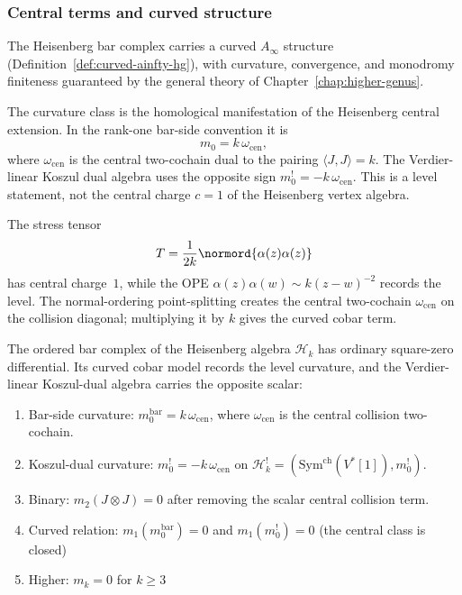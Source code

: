 \subsubsection{Central terms and curved structure}

The Heisenberg bar complex carries a curved $A_\infty$ structure
(Definition~\ref{def:curved-ainfty-hg}), with curvature, convergence,
and monodromy finiteness guaranteed by the general theory of
Chapter~\ref{chap:higher-genus}.

\begin{remark}
The curvature class is the homological manifestation of the
Heisenberg central extension. In the rank-one bar-side convention it
is
\[
m_0=k\,\omega_{\mathrm{cen}},
\]
where $\omega_{\mathrm{cen}}$ is the central two-cochain dual to the
pairing $\langle J,J\rangle=k$. The Verdier-linear Koszul dual
algebra uses the opposite sign $m_0^!=-k\,\omega_{\mathrm{cen}}$.
This is a level statement, not the central charge $c=1$ of the
Heisenberg vertex algebra.
\end{remark}

\begin{remark}
The stress tensor
\[
T=\frac{1}{2k}\normord{\alpha(z)\alpha(z)}
\]
has central charge~$1$, while the OPE
$\alpha(z)\alpha(w)\sim k(z-w)^{-2}$ records the level. The
normal-ordering point-splitting creates the central two-cochain
$\omega_{\mathrm{cen}}$ on the collision diagonal; multiplying it by
$k$ gives the curved cobar term.
\end{remark}

\begin{theorem}
\label{thm:heisenberg-curved-structure}
The ordered bar complex of the Heisenberg algebra $\mathcal{H}_k$
has ordinary square-zero differential. Its curved cobar model records
the level curvature, and the Verdier-linear Koszul-dual algebra
carries the opposite scalar:
\begin{enumerate}
\item Bar-side curvature: $m_0^{\mathrm{bar}} = k\,\omega_{\mathrm{cen}}$, where
 $\omega_{\mathrm{cen}}$ is the central collision two-cochain.
\item Koszul-dual curvature:
 $m_0^! = -k\,\omega_{\mathrm{cen}}$ on
 $\mathcal H_k^!=(\mathrm{Sym}^{\mathrm{ch}}(V^*[1]),m_0^!)$.
\item Binary: $m_2(J \otimes J) = 0$ after removing the scalar
 central collision term.
\item Curved relation: $m_1(m_0^{\mathrm{bar}}) = 0$ and
 $m_1(m_0^!)=0$ (the central class is closed)
\item Higher: $m_k = 0$ for $k \geq 3$
\end{enumerate}
\end{theorem}

